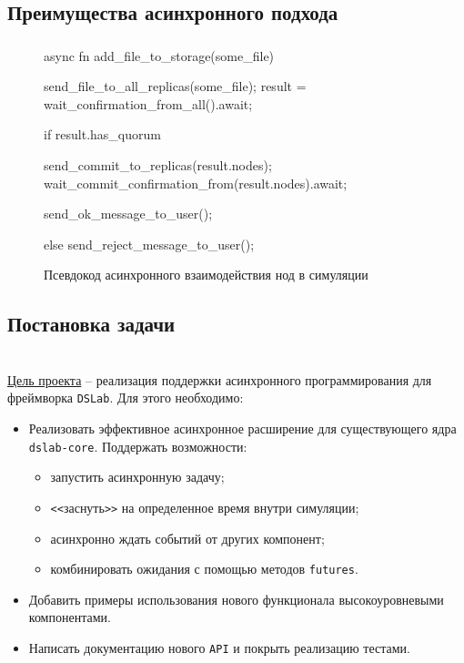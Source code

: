 \documentclass[t]{beamer}  %
\begin{document}
	\subsection{Преимущества асинхронного подхода}
	\begin{frame}[fragile]
		\frametitle{\insertsection} 
		\framesubtitle{\insertsubsection}

		\begin{figure}
			\footnotesize
			\centering
			\begin{rustcode}
async fn add_file_to_storage(some_file) {
  send_file_to_all_replicas(some_file);
  result = wait_confirmation_from_all().await;

  if result.has_quorum {
    send_commit_to_replicas(result.nodes);
    wait_commit_confirmation_from(result.nodes).await;

    send_ok_message_to_user();
  } else {
    send_reject_message_to_user();
  }
}
			\end{rustcode}
			\caption*{Псевдокод асинхронного взаимодействия нод в симуляции}
		\end{figure}


	\end{frame}

	\subsection{Постановка задачи}
	\begin{frame}
		\frametitle{\insertsection} 
		\framesubtitle{\insertsubsection}

		\vspace{0.3cm}
		\begin{columns}
			\begin{column}{1.05\linewidth}
				\underline{Цель проекта} -- реализация поддержки асинхронного программирования для фреймворка \texttt{DSLab}. Для этого необходимо:
				\vspace{3pt}
				\begin{itemize}
					\item Реализовать эффективное асинхронное расширение для существующего ядра \texttt{dslab-core}. Поддержать возможности:
					\begin{itemize}
						\item запустить асинхронную задачу;
						\item \texttt{<\textless}заснуть\texttt{>\textgreater} на определенное время внутри симуляции;
						\item асинхронно ждать событий от других компонент;
						\item комбинировать ожидания с помощью методов \texttt{futures}.
					\end{itemize}
					\item Добавить примеры использования нового функционала высокоуровневыми компонентами.
					\item Написать документацию нового \texttt{API} и покрыть реализацию тестами.
				\end{itemize}
			\end{column}
		\end{columns}
	\end{frame}
\end{document}
